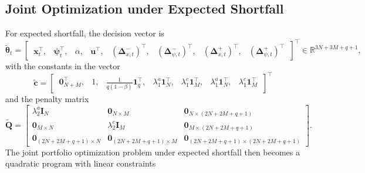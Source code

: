 \subsection{Joint Optimization under Expected Shortfall} \label{app:joint_es}

For expected shortfall, the decision vector is
\begin{equation*}
    \tilde{\bm{\theta}}_t = \begin{bmatrix}\, \bm{x}_t^\top,& \bm{\psi}_t^\top,& \alpha,& \bm{u}^\top,&
    (\bm{\Delta}_{x,t}^-)^\top,& (\bm{\Delta}_{\psi,t}^-)^\top,&
    (\bm{\Delta}_{x,t}^+)^\top,& (\bm{\Delta}_{\psi,t}^+)^\top \,\end{bmatrix}^\top
    \in \mathbb{R}^{3N+3M+q+1},
\end{equation*}
with the constants in the vector
\begin{equation*}
    \tilde{\bm{c}} = \begin{bmatrix}\, \bm{0}_{N+M}^\top,& 1,&
    \tfrac{1}{q(1-\beta)} \bm{1}_q^\top,&
    \lambda_1^a \bm{1}_N^\top,& \lambda_1^c \bm{1}_M^\top,&
    \lambda_1^a \bm{1}_N^\top,& \lambda_1^c \bm{1}_M^\top \,\end{bmatrix}^\top
\end{equation*}
and the penalty matrix
\begin{equation*}
    \tilde{\bm{Q}} =
    \begin{bmatrix}
        \lambda_2^a \bm{I}_N & \bm{0}_{N \times M} & \bm{0}_{N\times(2N + 2M + q + 1)} \\
        \bm{0}_{M \times N} & \lambda_2^c \bm{I}_M & \bm{0}_{M\times(2N + 2M + q + 1)} \\
        \bm{0}_{(2N+2M+q+1) \times N} & \bm{0}_{(2N+2M+q+1) \times M} & \bm{0}_{(2N+2M+q+1) \times (2N+2M+q+1)}
    \end{bmatrix}.
\end{equation*}
The joint portfolio optimization problem under expected shortfall then becomes a quadratic program with linear
constraints
